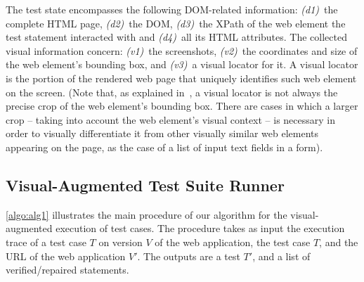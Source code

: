 


The test state encompasses the following DOM-related information: \textit{(d1)}~the complete HTML page, \textit{(d2)}~the DOM, \textit{(d3)}~the XPath of the web element the test statement interacted with and \textit{(d4)}~all its HTML attributes. The collected visual information concern: \textit{(v1)}~the screenshots, \textit{(v2)}~the coordinates and size of the web element's bounding box, and \textit{(v3)}~a visual locator for it. A visual locator is the portion of the rendered web page that uniquely identifies such web element on the screen. (Note that, as explained in~\cite{2014-Stocco-SCAM,2015-Leotta-SAC}, a visual locator is not always the precise crop of the web element's bounding box. There are cases in which a larger crop -- taking into account the web element's visual context --  is necessary in order to visually differentiate it from other visually similar web elements appearing on the page, as the case of a list of input text fields in a form).

\subsection{Visual-Augmented Test Suite Runner}

\autoref{algo:alg1} illustrates the main procedure of our algorithm for the visual-augmented execution of test cases. The procedure takes as input the execution trace of a test case $T$ on version $V$ of the web application, the test case $T$, and the URL of the web application $V'$. The outputs are a test $T'$, and a list of verified/repaired statements. 


